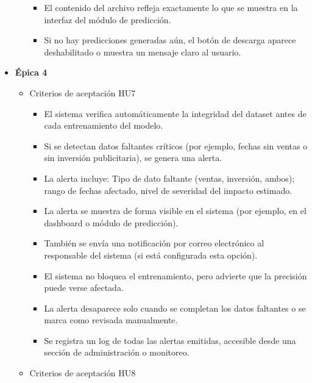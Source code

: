 \documentclass[
11pt, %
]{charter}
\begin{document}
\begin{itemize}
\begin{itemize}
\begin{itemize}
      \item El contenido del archivo refleja exactamente lo que se muestra en la interfaz del módulo de predicción.

      \item Si no hay predicciones generadas aún, el botón de descarga aparece deshabilitado o muestra un mensaje claro al usuario.
    \end{itemize}
    \end{itemize}
  \item \textbf{\'{E}pica 4}
    \begin{itemize}
      \item Criterios de aceptación HU7
      
    \begin{itemize}
      \item El sistema verifica automáticamente la integridad del dataset antes de cada entrenamiento del modelo.

      \item Si se detectan datos faltantes críticos (por ejemplo, fechas sin ventas o sin inversión publicitaria), se genera una alerta.

      \item La alerta incluye: Tipo de dato faltante (ventas, inversión, ambos); rango de fechas afectado, nivel de severidad del impacto estimado.

      \item La alerta se muestra de forma visible en el sistema (por ejemplo, en el dashboard o módulo de predicción).

      \item También se envía una notificación por correo electrónico al responsable del sistema (si está configurada esta opción).

      \item El sistema no bloquea el entrenamiento, pero advierte que la precisión puede verse afectada.

      \item La alerta desaparece solo cuando se completan los datos faltantes o se marca como revisada manualmente.

      \item Se registra un log de todas las alertas emitidas, accesible desde una sección de administración o monitoreo.
          \end{itemize}
          
      \item Criterios de aceptación HU8
      

\end{itemize}
\end{itemize}
\end{document}
